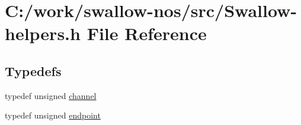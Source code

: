 \hypertarget{_swallow-helpers_8h}{}\section{C\+:/work/swallow-\/nos/src/\+Swallow-\/helpers.h File Reference}
\label{_swallow-helpers_8h}
\subsection*{Typedefs}
\begin{DoxyCompactItemize}
\item 
typedef unsigned \hyperlink{_swallow-helpers_8h_aa6ea79b51cb1a11714e12ddd689dd15c}{channel}
\item 
typedef unsigned \hyperlink{_swallow-helpers_8h_ab1358ba323e68c233f100abc11bdc7ea}{endpoint}
\end{DoxyCompactItemize}
